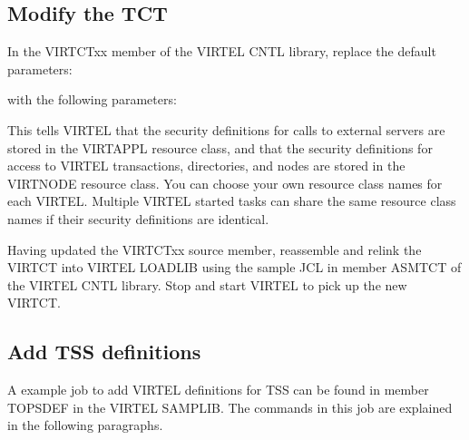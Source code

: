 \documentclass[letterpaper,10pt,english]{sphinxmanual}
\begin{document}
\subsection{Modify the TCT}
\label{\detokenize{Installation_Guide:modify-the-tct}}
In the VIRTCTxx member of the VIRTEL CNTL library, replace the default parameters:

\begin{sphinxVerbatim}[commandchars=\\\{\}]
\end{sphinxVerbatim}

with the following parameters:

\begin{sphinxVerbatim}[commandchars=\\\{\}]
\end{sphinxVerbatim}

This tells VIRTEL that the security definitions for calls to external servers are stored in the VIRTAPPL resource class, and that the security definitions for access to VIRTEL transactions, directories, and nodes are stored in the VIRTNODE resource class. You can choose your own resource class names for each VIRTEL.  Multiple VIRTEL started tasks can share the same resource class names if their security definitions are identical.

Having updated the VIRTCTxx source member, reassemble and relink the VIRTCT into VIRTEL LOADLIB using the sample JCL in member ASMTCT of the VIRTEL CNTL library. Stop and start VIRTEL to pick up the new VIRTCT.

\ignorespaces 

\subsection{Add TSS definitions}
\label{\detokenize{Installation_Guide:add-tss-definitions}}\label{\detokenize{Installation_Guide:index-185}}
A example job to add VIRTEL definitions for TSS can be found in member TOPSDEF in the VIRTEL SAMPLIB. The commands in this job are explained in the following paragraphs.
\end{document}
